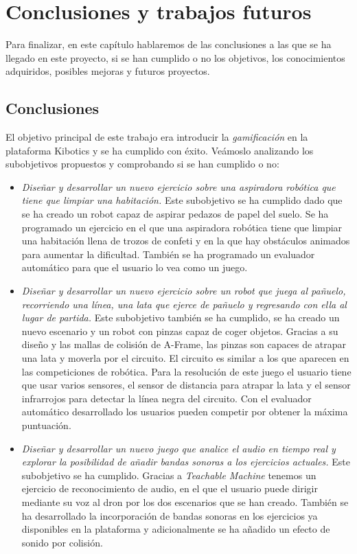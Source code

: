 \chapter{Conclusiones y trabajos futuros}\label{conclusion}
Para finalizar, en este capítulo hablaremos de las conclusiones a las que se ha llegado en este proyecto, si se han cumplido o no los objetivos,  los conocimientos adquiridos, posibles mejoras y futuros proyectos.

\section{Conclusiones}

El objetivo principal de este trabajo era introducir la \textit{gamificación} en la plataforma Kibotics y se ha cumplido con éxito. Veámoslo analizando los subobjetivos propuestos y comprobando si se han cumplido o no:

\begin{itemize}
    \item \textit{Diseñar y desarrollar un nuevo ejercicio sobre una aspiradora robótica que tiene que limpiar una habitación.}  
    Este subobjetivo se ha cumplido dado que se ha creado un robot capaz de aspirar pedazos de papel del suelo. Se ha programado un ejercicio en el que una aspiradora robótica tiene que limpiar una habitación llena de trozos de confeti y en la que hay obstáculos animados para aumentar la dificultad. También se ha programado un evaluador automático para que el usuario lo vea como un juego.

    \item \textit{Diseñar y desarrollar un nuevo ejercicio sobre un robot que juega al pañuelo, recorriendo una línea, una lata que ejerce de pañuelo y regresando con ella al lugar de partida.}
    Este subobjetivo también se ha cumplido, se ha creado un nuevo escenario y un robot con pinzas capaz de coger objetos. Gracias a su diseño y las mallas de colisión de A-Frame, las pinzas son capaces de atrapar una lata y moverla por el circuito. El circuito es similar a los que aparecen en las competiciones de robótica. Para la resolución de este juego el usuario tiene que usar varios sensores, el sensor de distancia para atrapar la lata y el sensor infrarrojos para detectar la línea negra del circuito. Con el evaluador automático desarrollado los usuarios pueden competir por obtener la máxima puntuación. 
    
        \item \textit{Diseñar y desarrollar un nuevo juego que analice el audio en tiempo real y explorar la posibilidad de añadir bandas sonoras a los ejercicios actuales.}  
        Este subobjetivo se ha cumplido. Gracias a \textit{Teachable Machine} tenemos un ejercicio de reconocimiento de audio, en el que el usuario puede dirigir mediante su voz al dron por los dos escenarios que se han creado. También se ha desarrollado la incorporación de bandas sonoras en los ejercicios ya disponibles en la plataforma y adicionalmente se ha añadido un efecto de sonido por colisión. 

\end{itemize}


